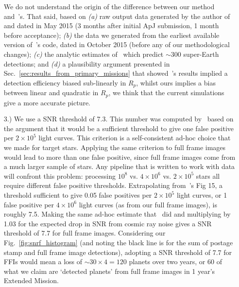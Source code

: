 \begin{itemize}
	We do not understand the origin of the difference between our method and~'s.
	That said, based on 
	\textit{(a)} raw output data generated by the author of~ and dated in May 2015 (3 months after initial ApJ submission, 1 month before acceptance); 
	\textit{(b)} the data we generated from the earliest available version of~'s code, dated in October 2015 (before any of our methodological changes); 
	\textit{(c)} the analytic estimates of~\citet{winn_searchable_2013} which predict $\sim300$ super-Earth detections;
	and \textit{(d)} a plausibility argument presented in Sec.~\ref{sec:results_from_primary_missions} that showed~'s results implied a detection efficiency biased sub-linearly in $R_p$, whilst ours implies a bias between linear and quadratic in $R_p$,
	we think that the current simulations give a more accurate picture.
	
	\item [3.) We use a SNR threshold of 7.3.] This number was computed by~ based on the argument that it would be a sufficient threshold to give one false positive per $2\times10^5$ light curves.
	This criterion is a self-consistent ad-hoc choice that we made for target stars.
	Applying the same criterion to full frame images would lead to more than one false positive, since full frame images come from a much larger sample of stars.
	Any pipeline that is written to work with \tess data will confront this problem:
	processing $10^8$ vs. $4\times10^6$ vs. $2\times10^5$ stars all require different false positive thresholds.
	Extrapolating from~'s Fig 15, a threshold sufficient to give 0.05 false positives per $2\times10^5$ light curves, or 1 false positive per $4\times10^6$ light curves (as from our full frame images), is roughly 7.5.
	Making the same ad-hoc estimate that~ did and multiplying by 1.03 for the expected drop in SNR from cosmic ray noise gives a SNR threshold of 7.7 for full frame images.
	Considering our Fig.~\ref{fig:snrf_histogram} (and noting the black line is for the sum of postage stamp and full frame image detections), adopting a SNR threshold of 7.7 for FFIs would mean a loss of $\sim30\times4=120$ planets over two years, or 60 of what we claim are `detected planets' from full frame images in 1 year's Extended Mission.	
	

\end{itemize}
